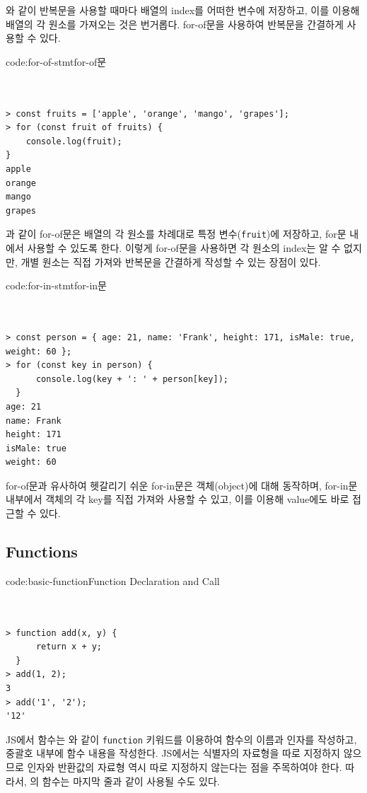 와 같이 반복문을 사용할 때마다 배열의 index를 어떠한 변수에 저장하고, 이를 이용해 배열의 각 원소를 가져오는 것은 번거롭다. for-of문을 사용하여 반복문을 간결하게 사용할 수 있다.

\begin{codeenv}{code:for-of-stmt}{for-of문}\begin{verbatim}


> const fruits = ['apple', 'orange', 'mango', 'grapes'];
> for (const fruit of fruits) {
    console.log(fruit);
}
apple
orange
mango
grapes
\end{verbatim}
\end{codeenv}

과 같이 for-of문은 배열의 각 원소를 차례대로 특정 변수(\texttt{fruit})에 저장하고, for문 내에서 사용할 수 있도록 한다. 이렇게 for-of문을 사용하면 각 원소의 index는 알 수 없지만, 개별 원소는 직접 가져와 반복문을 간결하게 작성할 수 있는 장점이 있다.

\begin{codeenv}{code:for-in-stmt}{for-in문}\begin{verbatim}


> const person = { age: 21, name: 'Frank', height: 171, isMale: true, weight: 60 };
> for (const key in person) {
      console.log(key + ': ' + person[key]);
  }
age: 21
name: Frank
height: 171
isMale: true
weight: 60
\end{verbatim}
\end{codeenv}

for-of문과 유사하여 헷갈리기 쉬운 for-in문은 객체(object)에 대해 동작하며, for-in문 내부에서 객체의 각 key를 직접 가져와 사용할 수 있고, 이를 이용해 value에도 바로 접근할 수 있다.

\subsection*{Functions}

\begin{codeenv}{code:basic-function}{Function Declaration and Call}\begin{verbatim}


> function add(x, y) {
      return x + y;
  }
> add(1, 2);
3
> add('1', '2');
'12'
\end{verbatim}
\end{codeenv}

JS에서 함수는 와 같이 \texttt{function} 키워드를 이용하여 함수의 이름과 인자를 작성하고, 중괄호 내부에 함수 내용을 작성한다. JS에서는 식별자의 자료형을 따로 지정하지 않으므로 인자와 반환값의 자료형 역시 따로 지정하지 않는다는 점을 주목하여야 한다. 따라서, 의 함수는 마지막 줄과 같이 사용될 수도 있다.


